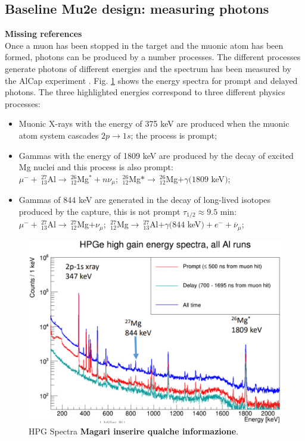 \documentclass[12pt,a4paper,openright, oneside, titlepage]{book} %
\begin{document}
\subsection{Baseline Mu2e design: measuring photons}
\textbf{Missing references}\\
Once a muon has been stopped in the target 
and the muonic atom has been formed, 
photons can be produced by a number processes. 
The different processes generate photons of different energies 
and the spectrum has been measured by the AlCap experiment \cite{AlCap:2015}\cite{AlCap:2020}.
Fig. \ref{_HPG_Spectra} shows the energy spectra for prompt and delayed photons.
The three highlighted energies correspond to three different physics processes:
\begin{itemize}
\item Muonic X-rays with the energy of 375 keV are produced when the muonic atom system cascades $2p\rightarrow 1s$; 
the process is prompt;
\item Gammas with the energy of 1809 keV are produced by the decay of excited Mg nuclei and this process is also prompt:\\
$\mu^-+\ _{13}^{27}$Al$\rightarrow \ _{12}^{26}$Mg$^*+n\nu_\mu$; $\ _{12}^{26}$Mg$*\rightarrow \ _{12}^{26}$Mg$+\gamma(1809$ keV$)$;
\item Gammas of 844 keV are generated in the decay of long-lived isotopes produced by the capture, this is not prompt $\tau_{1/2}\approx9.5$ min:\\
$\mu^-+\ _{13}^{27}$Al$\rightarrow \ _{12}^{27}$Mg$+\nu_\mu$; $\ _{12}^{27}$Mg$\rightarrow \ _{13}^{27}$Al$+\gamma(844$ keV$)+e^-+\overline{\nu}_\mu$;\\
\end{itemize}

\begin{figure}[h!]
\centering
\includegraphics[scale=0.6]{HPG_Spectra}
\caption[Photons spectrum from stopped muons]{HPG Spectra {\bf{Magari inserire qualche informazione}}.}
\label{_HPG_Spectra}
\end{figure}
\end{document}
